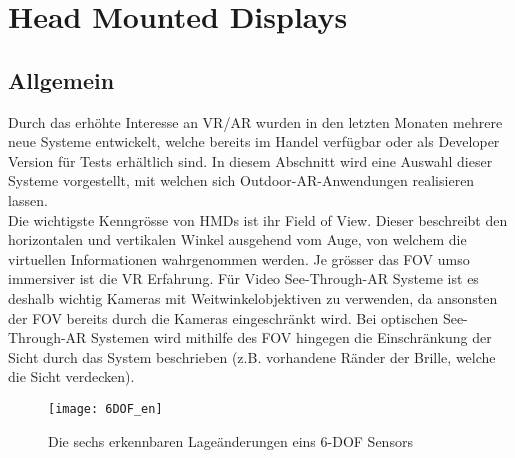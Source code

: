 \section{Head Mounted Displays}\label{s.displays}
\subsection*{Allgemein}
Durch das erhöhte Interesse an VR/AR wurden in den letzten Monaten mehrere neue Systeme entwickelt, welche bereits im Handel verfügbar oder als Developer Version für Tests erhältlich sind. In diesem Abschnitt wird eine Auswahl dieser Systeme vorgestellt, mit welchen sich Outdoor-AR-Anwendungen realisieren lassen.\\[6pt]
Die wichtigste Kenngrösse von HMDs ist ihr Field of View. Dieser beschreibt den horizontalen und vertikalen Winkel ausgehend vom Auge, von welchem die virtuellen Informationen wahrgenommen werden. Je grösser das FOV umso immersiver ist die VR Erfahrung. Für Video See-Through-AR Systeme ist es deshalb wichtig Kameras mit Weitwinkelobjektiven zu verwenden, da ansonsten der FOV bereits durch die Kameras eingeschränkt wird. Bei optischen See-Through-AR Systemen wird mithilfe des FOV hingegen die Einschränkung der Sicht durch das System beschrieben (z.B. vorhandene Ränder der Brille, welche die Sicht verdecken).\cite[S.~142~ff.]{doerner13}\\[6pt]
\vspace{-15pt}
\begin{wrapfigure}{r}{0.5\textwidth}
	\vspace{-25pt}
	\begin{center}
		\texttt{[image: 6DOF\_en]}
	\end{center}
	\vspace{-15pt}
	\captionsetup{width=0.42\textwidth}
	\caption{Die sechs erkennbaren Lageänderungen eins 6-DOF Sensors}\label{dof}
	\label{fig.dof}
	\vspace{-10pt}
\end{wrapfigure}
